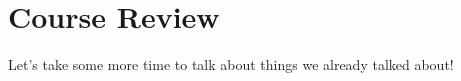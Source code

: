 




\section*{Course Review}

Let's take some more time to talk about things we already talked about!


